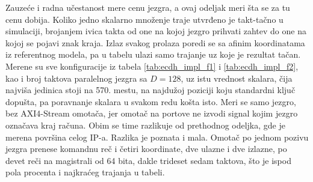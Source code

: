 Zauzeće i radna učestanost mere cenu jezgra, a ovaj odeljak meri šta se za tu cenu dobija. Koliko jedno skalarno množenje traje utvrđeno je takt-tačno u simulaciji, brojanjem ivica takta od one na kojoj jezgro prihvati zahtev do one na kojoj se pojavi znak kraja. Izlaz svakog prolaza poredi se sa afinim koordinatama iz referentnog modela, pa u tabelu ulazi samo trajanje uz koje je rezultat tačan. Merene su sve konfiguracije iz tabela \ref{tab:ecdh_impl_f1} i \ref{tab:ecdh_impl_f2}, kao i broj taktova paralelnog jezgra sa $D = 128$, uz istu vrednost skalara, čija najviša jedinica stoji na 570. mestu, na najdužoj poziciji koju standardni ključ dopušta, pa poravnanje skalara u svakom redu košta isto.
\smallbreak
Meri se samo jezgro, bez AXI4-Stream omotača, jer omotač na portove ne izvodi signal kojim jezgro označava kraj računa. Obim se time razlikuje od prethodnog odeljka, gde je merena površina celog IP-a. Razlika je poznata i mala. Omotač po jednom pozivu jezgra prenese komandnu reč i četiri koordinate, dve ulazne i dve izlazne, po devet reči na magistrali od 64 bita, dakle trideset sedam taktova, što je ispod pola procenta i najkraćeg trajanja u tabeli.

\begin{table}[H]
\caption{Trajanje jednog skalarnog množenja. Kolona $q = \lceil 571/D \rceil$ je broj digita koje množač obradi po jednom množenju u polju. Vreme $t$ dobija se deljenjem broja taktova radnom učestanošću iz tabela \ref{tab:ecdh_impl_f1} i \ref{tab:ecdh_impl_f2}, a poslednja kolona je odnos broja taktova dva jezgra pri istom $D$. Paralelno jezgro sa $D = 128$ nema vreme jer ne staje na ploču, pa mu se broj taktova zna iz simulacije, a radna učestanost ne postoji}
\centering
{\renewcommand{\arraystretch}{1.25}
}
\label{tab:ecdh_latencija}
\end{table}

